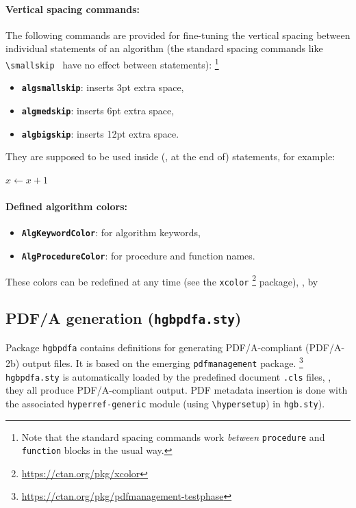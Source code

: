 \documentclass[language=english]{hgbarticle}
\begin{document}
\paragraph{Vertical spacing commands:}
The following commands are provided for fine-tuning the vertical spacing
between individual statements of an algorithm (the standard spacing commands
like \verb!\smallskip! \etc\ have no effect between statements):%
\footnote{Note that the standard spacing commands work \emph{between}
\texttt{procedure} and \texttt{function} blocks in the usual way.}
\begin{itemize}
    \item \textbf{{\bs}\texttt{algsmallskip}}: inserts 3pt extra space,
    \item \textbf{{\bs}\texttt{algmedskip}}: inserts 6pt extra space,
    \item \textbf{{\bs}\texttt{algbigskip}}: inserts 12pt extra space.
\end{itemize}
They are supposed to be used inside (\ie, at the end of) statements, for
example:
%
\begin{LaTeXCode}[numbers=none]
    \State $x \gets x + 1$ \algsmallskip
\end{LaTeXCode}

\paragraph{Defined algorithm colors:}
\begin{itemize}
    \item \textbf{\texttt{AlgKeywordColor}}: for algorithm keywords,
    \item \textbf{\texttt{AlgProcedureColor}}: for procedure and function names.
\end{itemize}
These colors can be redefined at any time (see the \texttt{xcolor}%
\footnote{\url{https://ctan.org/pkg/xcolor}}
package), \eg, by
\begin{LaTeXCode}[numbers=none]
\end{LaTeXCode}


\subsection{PDF/A generation (\texttt{hgbpdfa.sty})}

Package \texttt{hgbpdfa} contains definitions for generating PDF/A-compliant 
(PDF/A-2b) output files. It is based on the emerging  \texttt{pdfmanagement} package.%
\footnote{\url{https://ctan.org/pkg/pdfmanagement-testphase}}
\texttt{hgbpdfa.sty} is automatically loaded by the predefined document \texttt{.cls} files,
\ie, they all produce PDF/A-compliant output.
PDF metadata insertion is done with the associated \texttt{hyperref-generic} 
module (using \verb!\hypersetup!) in \texttt{hgb.sty}).
\end{document}
